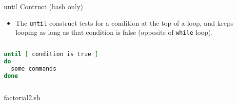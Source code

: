 \documentclass[10pt,t]{beamer}
\begin{document}
\begin{frame}[fragile]{until Contruct (bash only)}
  \begin{itemize}
  \item The \texttt{until} construct tests for a condition at the top of a loop, and keeps looping as long as that condition is false (opposite of \texttt{while} loop).
  \end{itemize}
  \begin{columns}
    \begin{exampleblock}{}
      \begin{lstlisting}[language=bash]
until [ condition is true ]
do
  some commands
done
      \end{lstlisting}
    \end{exampleblock}
  \end{columns}
  \begin{columns}
    \begin{exampleblock}{factorial2.sh}
      
    \end{exampleblock}
  \end{columns}
\end{frame}
\end{document}
